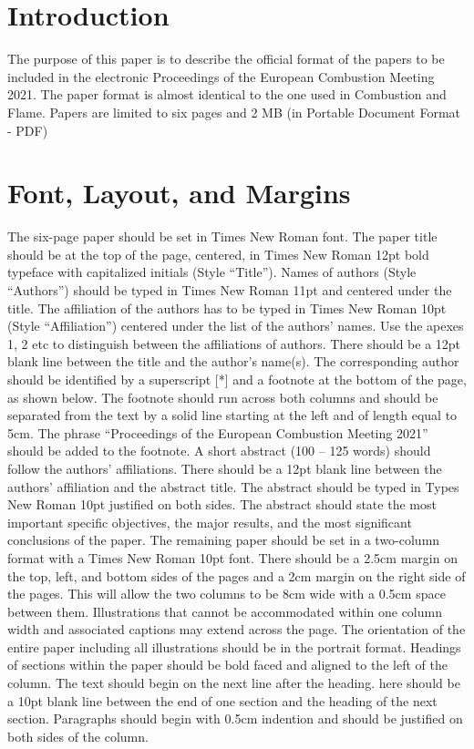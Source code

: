 \documentclass[10pt,a4paper]{ecm}
\begin{document}
\begin{multicols}{2}

\section*{Introduction}
The purpose of this paper is to describe the official format of the papers to be included in the electronic Proceedings of the European Combustion Meeting 2021.
The paper format is almost identical to the one used in Combustion and Flame.
Papers are limited to six pages and 2 MB (in Portable Document Format - PDF)

\section*{Font, Layout, and Margins}
The six-page paper should be set in Times New Roman font.
The paper title should be at the top of the page, centered, in Times New Roman 12pt bold typeface with capitalized initials (Style “Title”).
Names of authors (Style “Authors”) should be typed in Times New Roman 11pt and centered under the title.
The affiliation of the authors has to be typed in Times New Roman 10pt (Style “Affiliation”) centered under the list of the authors’ names.
Use the apexes 1, 2 etc to distinguish between the affiliations of authors.
There should be a 12pt blank line between the title and the author’s name(s).
The corresponding author should be identified by a superscript [*] and a footnote at the bottom of the page, as shown below. The footnote should run across both columns and should be separated from the text by a solid line starting at the left and of length equal to 5cm. 
The phrase “Proceedings of the European Combustion Meeting 2021” should be added to the footnote.
A short abstract (100 – 125 words) should follow the authors’ affiliations.
There should be a 12pt blank line between the authors’ affiliation and the abstract title.
The abstract should be typed in Types New Roman 10pt justified on both sides.
The abstract should state the most important specific objectives, the major results, and the most significant conclusions of the paper.
The remaining paper should be set in a two-column format with a Times New Roman 10pt font.
There should be a 2.5cm margin on the top, left, and bottom sides of the pages and a 2cm margin on the right side of the pages.
This will allow the two columns to be 8cm wide with a 0.5cm space between them.
Illustrations that cannot be accommodated within one column width and associated captions may extend across the page.
The orientation of the entire paper including all illustrations should be in the portrait format.
Headings of sections within the paper should be bold faced and aligned to the left of the column.
The text should begin on the next line after the heading. 
here should be a 10pt blank line between the end of one section and the heading of the next section.
Paragraphs should begin with 0.5cm indention and should be justified on both sides of the column.


\end{multicols}
\end{document}
